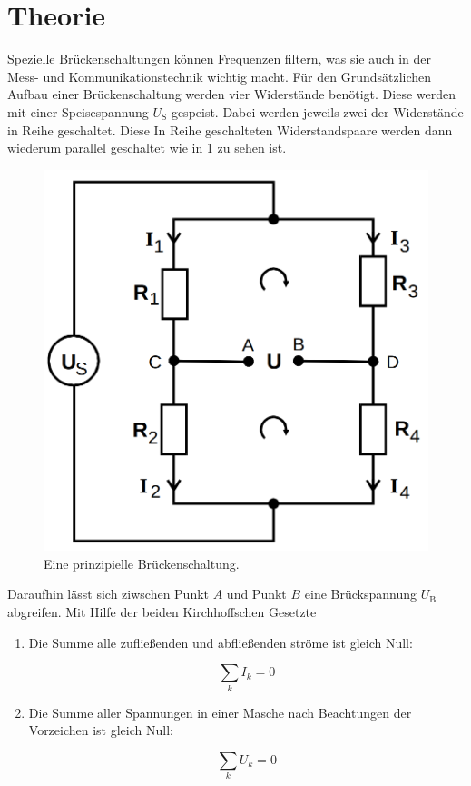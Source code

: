 \section{Theorie}
\label{sec:Theorie}

Spezielle Brückenschaltungen können Frequenzen filtern, was sie auch in der Mess- und Kommunikationstechnik wichtig macht.
Für den Grundsätzlichen Aufbau einer Brückenschaltung werden vier Widerstände benötigt.
Diese werden mit einer Speisespannung $U_\text{S}$ gespeist. Dabei werden jeweils zwei der Widerstände in Reihe geschaltet.
Diese In Reihe geschalteten Widerstandspaare werden dann wiederum parallel geschaltet wie in \ref{fig:brueckprinzip} zu sehen ist.

\begin{figure}
    \centering
    \includegraphics[scale=0.25]{content/Brueckenschaltung.png}
    \caption{Eine prinzipielle Brückenschaltung. \cite[S. 216]{anleitung}}
    \label{fig:brueckprinzip}
\end{figure}

Daraufhin lässt sich ziwschen Punkt $A$ und Punkt $B$ eine Brückspannung $U_\text{B}$ abgreifen.
Mit Hilfe der beiden Kirchhoffschen Gesetzte

\begin{enumerate}
    \item Die Summe alle zufließenden und abfließenden ströme ist gleich Null:
    
    \begin{equation}
        \sum_k I_k = 0
    \end{equation}
    \item Die Summe aller Spannungen in einer Masche nach Beachtungen der Vorzeichen ist gleich Null:
    
    \begin{equation}
        \sum_k U_k = 0
    \end{equation}
\end{enumerate}

